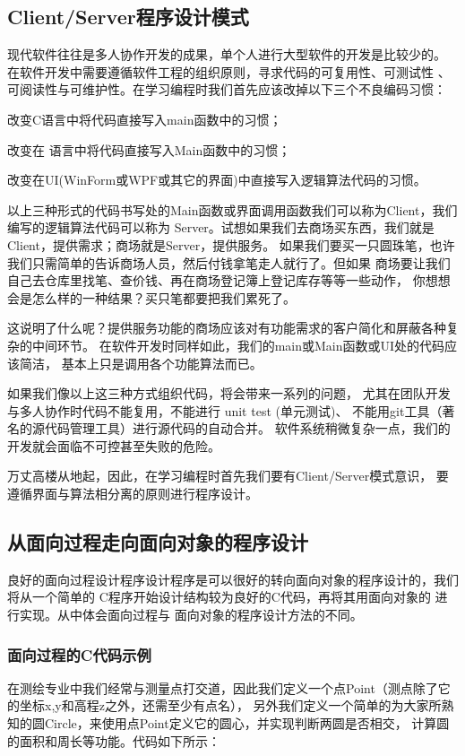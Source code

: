 \subsection{Client/Server程序设计模式}
现代软件往往是多人协作开发的成果，单个人进行大型软件的开发是比较少的。
在软件开发中需要遵循软件工程的组织原则，寻求代码的可复用性、可测试性
、可阅读性与可维护性。在学习编程时我们首先应该改掉以下三个不良编码习惯：

改变C语言中将代码直接写入main函数中的习惯；

改变在 \cs 语言中将代码直接写入Main函数中的习惯；

改变在UI(WinForm或WPF或其它的界面)中直接写入逻辑算法代码的习惯。

以上三种形式的代码书写处的Main函数或界面调用函数我们可以称为Client，我们编写的逻辑算法代码可以称为
Server。试想如果我们去商场买东西，我们就是Client，提供需求；商场就是Server，提供服务。
如果我们要买一只圆珠笔，也许我们只需简单的告诉商场人员，然后付钱拿笔走人就行了。但如果
商场要让我们自己去仓库里找笔、查价钱、再在商场登记簿上登记库存等等一些动作，
你想想会是怎么样的一种结果？买只笔都要把我们累死了。

这说明了什么呢？提供服务功能的商场应该对有功能需求的客户简化和屏蔽各种复杂的中间环节。
在软件开发时同样如此，我们的main或Main函数或UI处的代码应该简洁，
基本上只是调用各个功能算法而已。

如果我们像以上这三种方式组织代码，将会带来一系列的问题，
尤其在团队开发与多人协作时代码不能复用，不能进行 unit test (单元测试)、
不能用git工具（著名的源代码管理工具）进行源代码的自动合并。
软件系统稍微复杂一点，我们的开发就会面临不可控甚至失败的危险。

万丈高楼从地起，因此，在学习编程时首先我们要有Client/Server模式意识，
要遵循界面与算法相分离的原则进行程序设计。

\subsection{从面向过程走向面向对象的程序设计 }

良好的面向过程设计程序设计程序是可以很好的转向面向对象的程序设计的，我们将从一个简单的
C程序开始设计结构较为良好的C代码，再将其用面向对象的 \cs 进行实现。从中体会面向过程与
面向对象的程序设计方法的不同。

 \subsubsection{面向过程的C代码示例}

在测绘专业中我们经常与测量点打交道，因此我们定义一个点Point（测点除了它的坐标x,y和高程z之外，还需至少有点名），
 另外我们定义一个简单的为大家所熟知的圆Circle，来使用点Point定义它的圆心，并实现判断两圆是否相交，
 计算圆的面积和周长等功能。代码如下所示：

